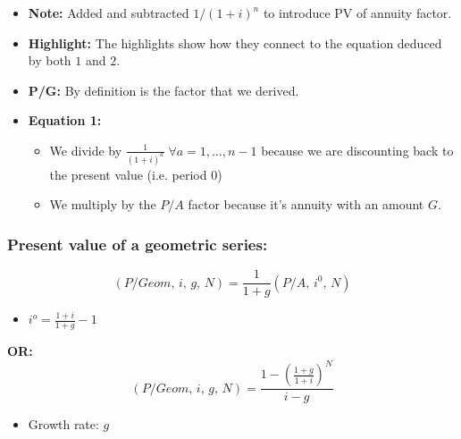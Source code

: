     \begin{derivation}
        \begin{itemize}
            \item \textbf{Note:} Added and subtracted $1/(1+i)^n$ to introduce PV of annuity factor.
            \item \textbf{Highlight:} The highlights show how they connect to the equation deduced by both $1$ and $2$. 
            \item \textbf{P/G:} By definition is the factor that we derived.
            \item \textbf{Equation 1:} 
            \begin{itemize}
                \item We divide by $\frac{1}{(1+i)^a} \; \forall a=1,\ldots,n-1$ because we are discounting back to the present value (i.e. period 0)
                \item We multiply by the $P/A$ factor because it's annuity with an amount $G$.
            \end{itemize}
        \end{itemize}
    \end{derivation}

    \subsubsection{Present value of a geometric series:}
    \begin{definition}
        \begin{equation}
            \left(P/Geom, \, i, \, g, \, N\right) = \frac{1}{1+g} \left(P/A, \, i^0, \, N\right)
        \end{equation}
        \begin{itemize}
            \item $i^o = \frac{1+i}{1+g} - 1$
        \end{itemize}
        \textbf{OR:}
        \begin{equation}
            \left(P/Geom, \, i, \, g, \, N\right) = \frac{1 - \left(\frac{1+g}{1+i}\right)^N}{i - g}
        \end{equation}
        \begin{itemize}
            \item Growth rate: $g$
        \end{itemize}
    \end{definition}

